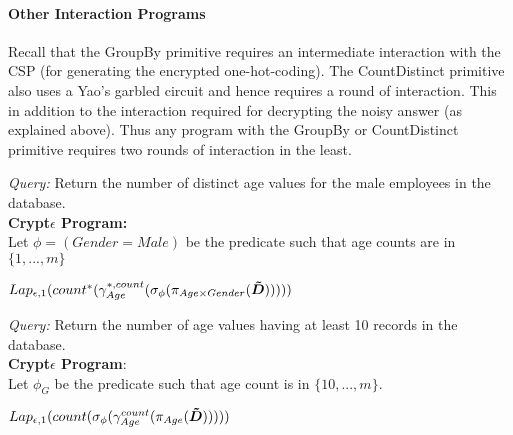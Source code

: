 \paragraph{\textbf{Other Interaction Programs}}
Recall that the \textsf{GroupBy} primitive requires an intermediate interaction with the \textsf{CSP} (for generating the encrypted one-hot-coding). The \textsf{CountDistinct} primitive also uses a Yao's garbled circuit and hence requires a round of interaction. This in addition to the interaction required for decrypting the noisy answer (as explained above). Thus any program with the \textsf{GroupBy} or \textsf{CountDistinct} primitive requires two rounds of interaction in the least. 
\begin{exmp}\textit{Query:} Return the number of distinct age values for the male employees in the database. \\ \textbf{Crypt$\epsilon$ Program:} \\Let  $\phi=(Gender=Male)$ be the predicate such that age counts are in $\{1,...,m\}$\end{exmp} $Lap_{\epsilon,1}(count^*(\gamma^{*,count}_{Age}(\sigma_{\phi}(\pi_{Age \times Gender}(\boldsymbol{\tilde{D}})))))$ %
\begin{exmp}\textit{Query: } Return the number of  age values having at least 10 records in the database. \\ \textbf{Crypt$\epsilon$ Program}:\\ Let $\phi_G$ be the predicate such that age count is in $\{10,...,m\}$. \end{exmp}
$Lap_{\epsilon,1}(count(\sigma_{\phi}(\gamma^{count}_{Age}(\pi_{Age}(\boldsymbol{\tilde{D}})))))$
